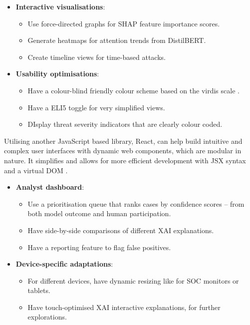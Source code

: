 \begin{itemize}
  \item \textbf{Interactive visualisations}:
  \begin{itemize}
    \item Use force-directed graphs for SHAP feature importance scores.
    \item Generate heatmaps for attention trends from DistilBERT.
    \item Create timeline views for time-based attacks.
  \end{itemize}
  \item \textbf{Usability optimisations}:
  \begin{itemize}
    \item Have a colour-blind friendly colour scheme based on the virdis scale \citep{sallan2021virdis}.
    \item Have a ELI5 toggle for very simplified views.
    \item DIsplay threat severity indicators that are clearly colour coded.
  \end{itemize}
\end{itemize}

\noindent Utilising another JavaScript based library, React, can help build intuitive and complex user interfaces with dynamic web components, which are modular in nature. It simplifies and allows for more efficient development with JSX syntax and a virtual DOM \citep{meta2025react}.

\begin{itemize}
  \item \textbf{Analyst dashboard}:
  \begin{itemize}
    \item Use a prioritisation queue that ranks cases by confidence scores -- from both model outcome and human participation.
    \item Have side-by-side comparisons of different XAI explanations.
    \item Have a reporting feature to flag false positives.
  \end{itemize}
  \item \textbf{Device-specific adaptations}:
  \begin{itemize}
    \item For different devices, have dynamic resizing like for SOC monitors or tablets.
    \item Have touch-optimised XAI interactive explanations, for further explorations.
  \end{itemize}
\end{itemize}
